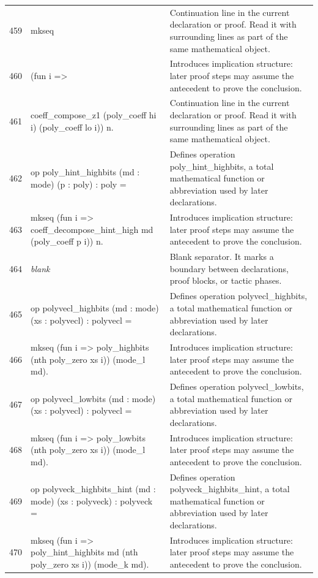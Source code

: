 \documentclass[10pt]{article}
\begin{document}
\begin{longtable}{r L{0.53\textwidth} L{0.37\textwidth}}
459 & {\ttfamily\scriptsize   mkseq} & Continuation line in the current declaration or proof.  Read it with surrounding lines as part of the same mathematical object. \\
460 & {\ttfamily\scriptsize     (fun i =>} & Introduces implication structure: later proof steps may assume the antecedent to prove the conclusion. \\
461 & {\ttfamily\scriptsize       coeff\_compose\_z1 (poly\_coeff hi i) (poly\_coeff lo i)) n.} & Continuation line in the current declaration or proof.  Read it with surrounding lines as part of the same mathematical object. \\
462 & {\ttfamily\scriptsize op poly\_hint\_highbits (md : mode) (p : poly) : poly =} & Defines operation poly\_hint\_highbits, a total mathematical function or abbreviation used by later declarations. \\
463 & {\ttfamily\scriptsize   mkseq (fun i => coeff\_decompose\_hint\_high md (poly\_coeff p i)) n.} & Introduces implication structure: later proof steps may assume the antecedent to prove the conclusion. \\
464 & {\ttfamily\scriptsize \emph{blank}} & Blank separator.  It marks a boundary between declarations, proof blocks, or tactic phases. \\
465 & {\ttfamily\scriptsize op polyvecl\_highbits (md : mode) (xs : polyvecl) : polyvecl =} & Defines operation polyvecl\_highbits, a total mathematical function or abbreviation used by later declarations. \\
466 & {\ttfamily\scriptsize   mkseq (fun i => poly\_highbits (nth poly\_zero xs i)) (mode\_l md).} & Introduces implication structure: later proof steps may assume the antecedent to prove the conclusion. \\
467 & {\ttfamily\scriptsize op polyvecl\_lowbits (md : mode) (xs : polyvecl) : polyvecl =} & Defines operation polyvecl\_lowbits, a total mathematical function or abbreviation used by later declarations. \\
468 & {\ttfamily\scriptsize   mkseq (fun i => poly\_lowbits (nth poly\_zero xs i)) (mode\_l md).} & Introduces implication structure: later proof steps may assume the antecedent to prove the conclusion. \\
469 & {\ttfamily\scriptsize op polyveck\_highbits\_hint (md : mode) (xs : polyveck) : polyveck =} & Defines operation polyveck\_highbits\_hint, a total mathematical function or abbreviation used by later declarations. \\
470 & {\ttfamily\scriptsize   mkseq (fun i => poly\_hint\_highbits md (nth poly\_zero xs i)) (mode\_k md).} & Introduces implication structure: later proof steps may assume the antecedent to prove the conclusion. \\

\end{longtable}
\end{document}
